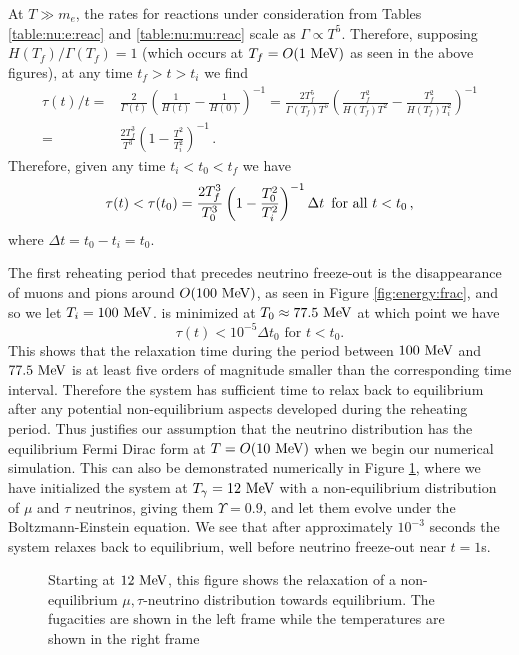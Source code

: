 At $T\gg m_e$, the rates for reactions under consideration from Tables \ref{table:nu:e:reac} and \ref{table:nu:mu:reac} scale as $\Gamma\propto T^5$.  Therefore, supposing $H(T_f)/\Gamma(T_f)=1$ (which occurs at $T_f=O(1\text{ MeV})$ as seen in the above figures), at any time $t_f>t>t_i$ we find 
\begin{align}\label{relax_time}
\tau(t)/t=&\frac{2}{\Gamma(t)}\left(\frac{1}{H(t)}-\frac{1}{H(0)}\right)^{-1}=\frac{2T_f^5}{\Gamma(T_f)T^5}\left(\frac{T_f^2}{H(T_f)T^2}-\frac{T_f^2}{H(T_f)T_i^2}\right)^{-1}\\
=&\frac{2T_f^3}{T^3}\left(1-\frac{T^2}{T_i^2}\right)^{-1}\,.
\end{align}
Therefore, given any time $t_i<t_0<t_f$ we have
\begin{equation}\label{ch6:tau_eq}
\tau(t)<\tau(t_0)=\frac{2T_f^3}{T_0^3}\left(1-\frac{T_0^2}{T_i^2}\right)^{-1}\Delta t \text{ \,for all } t<t_0\,,
\end{equation}
where $\Delta t=t_0-t_i=t_0$.

 The first reheating period that precedes neutrino freeze-out is the disappearance of muons and pions around $O(100\text{ MeV})$, as seen in Figure \ref{fig:energy:frac}, and so we let $T_i=100\text{ MeV}$.  is minimized at $T_0\approx 77.5\text{ MeV}$ at which point we have 
\begin{equation}
\tau(t)<10^{-5} \Delta t_0 \text{ for } t<t_0.
\end{equation}
This shows that the relaxation time during the period between $100\text{ MeV}$ and $77.5\text{ MeV}$ is at least five orders of magnitude smaller than the corresponding time interval.  Therefore the system has sufficient time to relax back to equilibrium after any potential non-equilibrium aspects developed during the reheating period.  Thus justifies our assumption that the neutrino distribution has the equilibrium Fermi Dirac form at $T=O(10 \text{ MeV})$ when we begin our numerical simulation. This can also be demonstrated numerically in Figure \ref{fig:relax}, where we have initialized the system at $T_\gamma=12\text{ MeV}$ with a non-equilibrium distribution of $\mu$ and $\tau$ neutrinos, giving them $\Upsilon=0.9$, and let them evolve under the Boltzmann-Einstein equation.  We see that after approximately $10^{-3}$ seconds the system relaxes back to equilibrium, well before neutrino freeze-out near $t=1$s.

\begin{figure} 
\begin{minipage}{\linewidth}
\end{minipage}
\caption{Starting at $12\text{ MeV}$, this figure shows the relaxation of a non-equilibrium $\mu,\tau$-neutrino distribution towards equilibrium. The fugacities are shown in the left frame while the temperatures are shown in the right frame}
\label{fig:relax}
 \end{figure}

